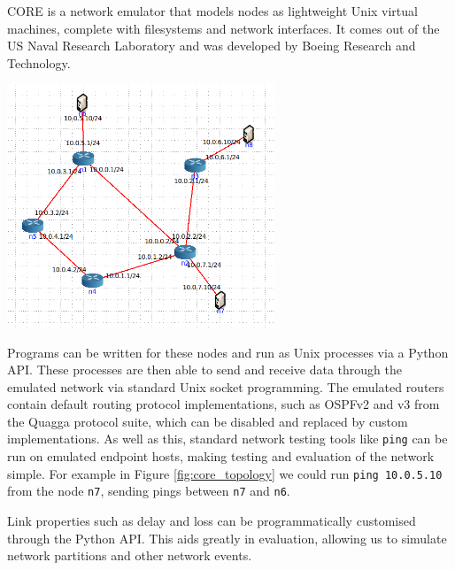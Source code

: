 \documentclass[10pt,twoside,a4paper]{article}
\begin{document}
CORE is a network emulator that models nodes as lightweight Unix virtual machines, complete with filesystems and network interfaces. It comes out of the US Naval Research Laboratory and was developed by Boeing Research and Technology.

\begin{minipage}{1\textwidth} \centering
	\includegraphics[width=0.6\textwidth]{core_topology}
	\label{fig:core_topology}
\end{minipage}

Programs can be written for these nodes and run as Unix processes via a Python API. These processes are then able to send and receive data through the emulated network via standard Unix socket programming. The emulated routers contain default routing protocol implementations, such as OSPFv2 and v3 from the Quagga protocol suite, which can be disabled and replaced by custom implementations. As well as this, standard network testing tools like \texttt{ping} can be run on emulated endpoint hosts, making testing and evaluation of the network simple. For example in Figure \ref{fig:core_topology} we could run \texttt{ping 10.0.5.10} from the node \texttt{n7}, sending pings between \texttt{n7} and \texttt{n6}.

Link properties such as delay and loss can be programmatically customised through the Python API. This aids greatly in evaluation, allowing us to simulate network partitions and other network events.
\end{document}
